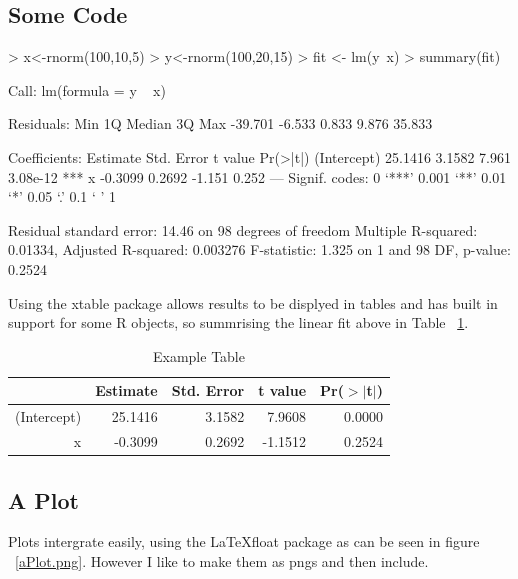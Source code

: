 \documentclass[a4paper]{article}
\begin{document}
\subsection{Some Code}
\begin{Schunk}
\begin{Sinput}
> x<-rnorm(100,10,5)
> y<-rnorm(100,20,15)
> fit <- lm(y~x)
> summary(fit)
\end{Sinput}
\begin{Soutput}
Call:
lm(formula = y ~ x)

Residuals:
    Min      1Q  Median      3Q     Max 
-39.701  -6.533   0.833   9.876  35.833 

Coefficients:
            Estimate Std. Error t value Pr(>|t|)    
(Intercept)  25.1416     3.1582   7.961 3.08e-12 ***
x            -0.3099     0.2692  -1.151    0.252    
---
Signif. codes:  0 ‘***’ 0.001 ‘**’ 0.01 ‘*’ 0.05 ‘.’ 0.1 ‘ ’ 1 

Residual standard error: 14.46 on 98 degrees of freedom
Multiple R-squared: 0.01334,	Adjusted R-squared: 0.003276 
F-statistic: 1.325 on 1 and 98 DF,  p-value: 0.2524 
\end{Soutput}
\end{Schunk}
Using the xtable package allows results to be displyed in tables and has built in support for some R objects, so summrising the linear fit above in Table ~\ref{ATable}.
\begin{table}[ht]
\begin{center}
\begin{tabular}{rrrrr}
  \hline
 & Estimate & Std. Error & t value & Pr($>$$|$t$|$) \\ 
  \hline
(Intercept) & 25.1416 & 3.1582 & 7.9608 & 0.0000 \\ 
  x & -0.3099 & 0.2692 & -1.1512 & 0.2524 \\ 
   \hline
\end{tabular}
\caption{Example Table}
\label{ATable}
\end{center}
\end{table}\subsection{A Plot}
 
Plots intergrate easily, using the \LaTeX float package as can be seen in figure ~\ref{aPlot.png}.  However I like to make them as pngs and then include.
\end{document}
